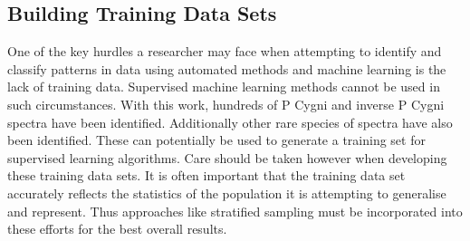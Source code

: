 \subsection{Building Training Data Sets}

One of the key hurdles a researcher may face when attempting to identify and classify patterns in data using automated methods and machine learning is the lack of training data. Supervised machine learning methods cannot be used in such circumstances. With this work, hundreds of P Cygni and inverse P Cygni spectra have been identified. Additionally other rare species of spectra have also been identified. These can potentially be used to generate a training set for supervised learning algorithms. Care should be taken however when developing these training data sets. It is often important that the training data set accurately reflects the statistics of the population it is attempting to generalise and represent. Thus approaches like stratified sampling must be incorporated into these efforts for the best overall results. 